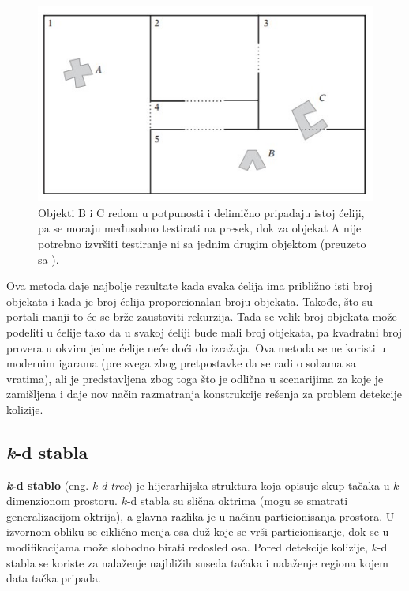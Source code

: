 \documentclass[12pt,oneside]{memoir}
\begin{document}
\begin{figure}[h!]
	\centering
	\includegraphics[scale=1]{cellsObj.jpg}
	\caption{ Objekti B i C redom u potpunosti i delimično pripadaju istoj ćeliji, pa se moraju međusobno testirati na presek,
	 dok za objekat A nije potrebno izvršiti testiranje ni sa jednim drugim objektom (preuzeto sa \cite{glavnaKnjiga}). }
	
	\label{fig:cellsObj}
\end{figure}

Ova metoda daje najbolje rezultate kada svaka ćelija ima približno isti broj objekata i kada je 
broj ćelija proporcionalan broju objekata.
Takođe, što su portali manji to će se brže zaustaviti rekurzija.
Tada se velik broj objekata može podeliti u ćelije tako da u svakoj ćeliji bude mali broj objekata,
pa kvadratni broj provera u okviru jedne ćelije neće doći do izražaja.
Ova metoda se ne koristi u modernim igarama (pre svega zbog pretpostavke da se radi o sobama sa vratima),
ali je predstavljena zbog toga što je odlična u scenarijima za
koje je zamišljena i daje nov način razmatranja konstrukcije rešenja za problem detekcije kolizije.


\subsection{\emph{k}-d stabla}
\label{subsec:grid}

\textbf{\emph{k}-d stablo} (eng. {\em k-d tree}) je hijerarhijska struktura koja opisuje skup tačaka u $k$-dimenzionom prostoru.
$k$-d stabla su slična oktrima (mogu se smatrati generalizacijom oktrija), a glavna razlika je u načinu particionisanja prostora.
U izvornom obliku se ciklično menja osa duž koje se vrši particionisanje, dok se u modifikacijama može slobodno birati redosled osa.
Pored detekcije kolizije, $k$-d stabla se koriste za nalaženje najbližih suseda tačaka i nalaženje regiona kojem data tačka pripada.
\end{document}
